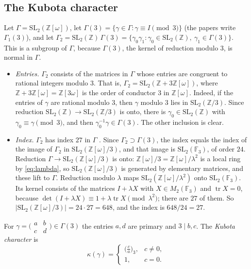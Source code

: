 \documentclass[11pt]{article}
\numberwithin{equation}{section}
\newcommand{\OO}{\mathbb Z[\omega]}
\newcommand{\Z}{\mathbb Z}
\newcommand{\F}{\mathbb F}
\theoremstyle{definition}
\theoremstyle{remark}
\begin{document}
\subsection{The Kubota character}\label{sec:kubota}
Let $\Gamma=\mathrm{SL}_2(\OO)$, let $\Gamma(3)=\{\gamma\in\Gamma:\gamma\equiv I\pmod3\}$ (the papers write $\Gamma_1(3)$), and let
$\Gamma_2=\mathrm{SL}_2(\Z)\,\Gamma(3)=\{\gamma_0\gamma_1:\gamma_0\in\mathrm{SL}_2(\Z),\ \gamma_1\in\Gamma(3)\}$. This is a
subgroup of $\Gamma$, because $\Gamma(3)$, the kernel of reduction modulo $3$, is normal in $\Gamma$.
\begin{itemize}
\item \emph{Entries.} $\Gamma_2$ consists of the matrices in $\Gamma$ whose entries are congruent to rational integers
modulo $3$. That is, $\Gamma_2=\mathrm{SL}_2(\Z+3\OO)$, where $\Z+3\OO=\Z[3\omega]$ is the order of conductor $3$ in $\OO$.
Indeed, if the entries of $\gamma$ are rational modulo $3$, then $\gamma$ modulo $3$ lies in $\mathrm{SL}_2(\Z/3)$. Since
reduction $\mathrm{SL}_2(\Z)\to\mathrm{SL}_2(\Z/3)$ is onto, there is $\gamma_0\in\mathrm{SL}_2(\Z)$ with
$\gamma_0\equiv\gamma\pmod3$, and then $\gamma_0^{-1}\gamma\in\Gamma(3)$. The other inclusion is clear.
\item \emph{Index.} $\Gamma_2$ has index $27$ in $\Gamma$ \cite[\S5.1]{DR}. Since $\Gamma_2\supset\Gamma(3)$, the index
equals the index of the image of $\Gamma_2$ in $\mathrm{SL}_2(\OO/3)$, and that image is $\mathrm{SL}_2(\F_3)$, of order
$24$. Reduction $\Gamma\to\mathrm{SL}_2(\OO/3)$ is onto: $\OO/3=\OO/\lambda^2$ is a local ring by \eqref{eq:lambda}, so
$\mathrm{SL}_2(\OO/3)$ is generated by elementary matrices, and these lift to $\Gamma$. Reduction modulo $\lambda$ maps
$\mathrm{SL}_2(\OO/\lambda^2)$ onto $\mathrm{SL}_2(\F_3)$. Its kernel consists of the matrices $I+\lambda X$ with
$X\in M_2(\F_3)$ and $\operatorname{tr}X=0$, because $\det(I+\lambda X)\equiv1+\lambda\operatorname{tr}X\pmod{\lambda^2}$;
there are $27$ of them. So $|\mathrm{SL}_2(\OO/3)|=24\cdot27=648$, and the index is $648/24=27$.
\end{itemize}
For $\gamma=\bigl(\begin{smallmatrix}a&b\\c&d\end{smallmatrix}\bigr)\in\Gamma(3)$ the entries $a,d$ are primary and $3\mid b,c$. The
\emph{Kubota character} is
\begin{equation}\label{eq:kubota}
 \kappa(\gamma)=\begin{cases}\bigl(\frac ca\bigr)_3,&c\ne0,\\[2pt] 1,&c=0.\end{cases}
\end{equation}
\end{document}
